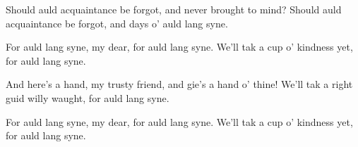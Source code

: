 

\beginverse*
Should auld acquaintance be forgot,
and never brought to mind?
Should auld acquaintance be forgot,
and days o' auld lang syne. 
\endverse

\beginchorus
For auld lang syne, my dear,
for auld lang syne.
We'll tak a cup o' kindness yet,
for auld lang syne.
\endchorus

\beginverse*
And here's a hand, my trusty friend,
and gie's a hand o' thine!
We'll tak a right guid willy waught,
for auld lang syne. 
\endverse

\beginchorus
For auld lang syne, my dear,
for auld lang syne.
We'll tak a cup o' kindness yet,
for auld lang syne.
\endchorus
\endsong
